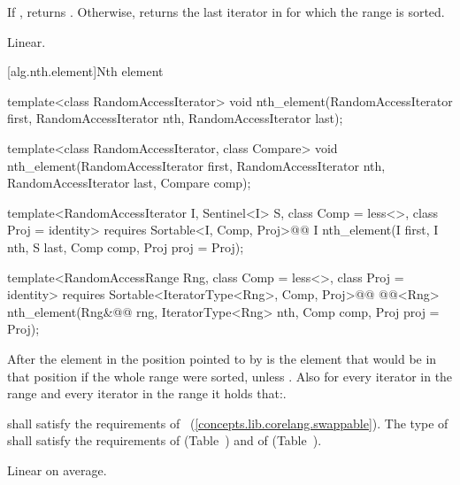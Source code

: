 \begin{itemdescr}
\pnum
\returns If , returns
. Otherwise, returns
the last iterator  in  for which the
range  is sorted.

\pnum
\complexity Linear.
\end{itemdescr}

[alg.nth.element]{Nth element}

%
\begin{removedblock}
\begin{itemdecl}
template<class RandomAccessIterator>
  void nth_element(RandomAccessIterator first, RandomAccessIterator nth,
                   RandomAccessIterator last);

template<class RandomAccessIterator, class Compare>
  void nth_element(RandomAccessIterator first, RandomAccessIterator nth,
                   RandomAccessIterator last,  Compare comp);
\end{itemdecl}
\end{removedblock}
\begin{addedblock}
\begin{itemdecl}
template<RandomAccessIterator I, Sentinel<I> S, class Comp = less<>,
    class Proj = identity>
  requires Sortable<I, Comp, Proj>@\newtxt{()}@
  I nth_element(I first, I nth, S last, Comp comp, Proj proj = Proj{});

template<RandomAccessRange Rng, class Comp = less<>, class Proj = identity>
  requires Sortable<IteratorType<Rng>, Comp, Proj>@\newtxt{()}@
  @@<Rng>
    nth_element(Rng&@\newtxt{\&}@ rng, IteratorType<Rng> nth, Comp comp, Proj proj = Proj{});
\end{itemdecl}
\end{addedblock}

\begin{itemdescr}
\pnum
After
the element in the position pointed to by 
is the element that would be
in that position if the whole range were sorted, unless .
Also for every iterator
in the range
and every iterator
in the range
it holds that:.

\begin{removedblock}
\pnum
\requires
{} shall satisfy the requirements of
~(\ref{concepts.lib.corelang.swappable}). The type
of  shall satisfy the requirements of
 (Table~) and of
 (Table~).
\end{removedblock}

\pnum
\complexity
Linear on average.
\end{itemdescr}

